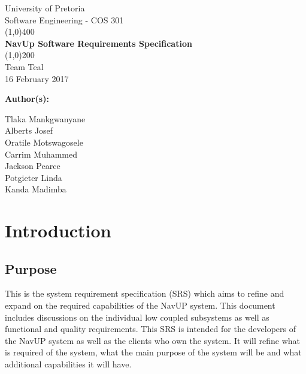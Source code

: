 \documentclass{article}
\begin{document}
\begin{titlepage}
	\begin{center}
	\huge{University of Pretoria\\
	Software Engineering - COS 301}\\
	\line(1,0){400}\\
	\huge{\bfseries NavUp Software Requirements Specification}\\
	\line(1,0){200}\\
	Team Teal\\
	16 February 2017\\
	[3cm]
	\end{center}
	\begin{flushleft}
	\bfseries{Author(s):}
	\end{flushleft}
	\begin{flushleft}
	Tlaka Mankgwanyane	\\
	Alberts Josef			\\
	Oratile Motswagosele	\\
	Carrim Muhammed		\\
	Jackson Pearce			\\
	Potgieter Linda		\\
	Kanda Madimba			\\
	\end{flushleft}
\end{titlepage}

\tableofcontents

\section{Introduction}
\subsection{Purpose} 
This is the system requirement specification (SRS) which aims to refine and expand on the required capabilities of the NavUP system.
This document includes discussions on the individual low coupled subsystems as well as functional and quality requirements. This SRS is intended for the developers of the NavUP system as well as the clients who own the system. It will refine what is required of the system, what the main purpose of the system will be and what additional capabilities it will have.
\end{document}
